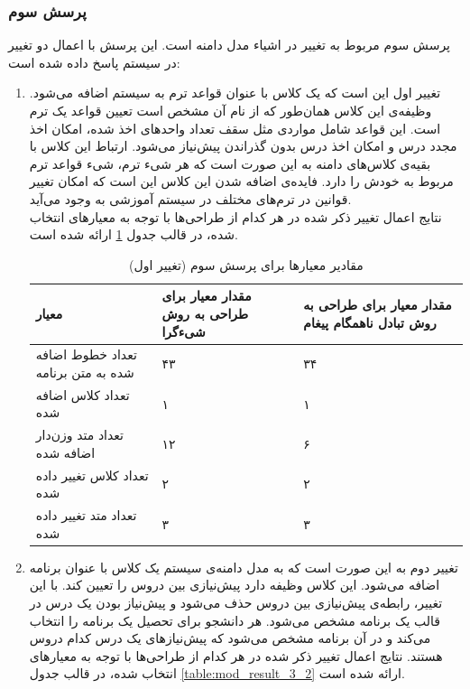 \subsubsection{پرسش سوم}
پرسش سوم مربوط به تغییر در اشیاء مدل دامنه است. این پرسش با اعمال دو تغییر در سیستم پاسخ داده شده است:
\begin{enumerate}
\item تغییر اول این است که یک کلاس با عنوان قواعد ترم به سیستم اضافه می‌شود. وظیفه‌ی این کلاس همان‌طور که از نام آن مشخص است تعیین قواعد یک ترم است. این قواعد شامل مواردی مثل سقف تعداد واحدهای اخذ شده، امکان اخذ مجدد درس و امکان اخذ درس بدون گذراندن پیش‌نیاز می‌شود. ارتباط این کلاس با بقیه‌ی کلاس‌های دامنه به این صورت است که هر شیء ترم، شیء قواعد ترم مربوط به خودش را دارد. فایده‌ی اضافه شدن این کلاس این است که امکان تغییر قوانین در ترم‌های مختلف در سیستم آموزشی به وجود می‌آید. \\
 نتایج اعمال تغییر ذکر شده در هر کدام از طراحی‌ها با توجه به معیارهای انتخاب شده، در قالب جدول \ref{table:mod_result_3_1} ارائه شده است.




\begin{table}[ht]
\small
\begin{center}
\begin{tabular}{|p{7cm}|p{4cm}|p{4cm}|}
	\hline
\textbf{معیار} & \textbf{مقدار معیار برای طراحی به روش شیءگرا} & \textbf{مقدار معیار برای طراحی به روش تبادل ناهمگام پیغام} 
\\ 
	\hline
	تعداد خطوط اضافه شده به متن برنامه
	 &
	 ۴۳
	 &
	 ۳۴
\\
	\hline
	تعداد کلاس اضافه شده
	 &
	 ۱
	 &
	 ۱
\\
	\hline
	تعداد متد وزن‌دار اضافه شده
	 &
	 ۱۲
	 &
	 ۶
\\
	\hline

	تعداد کلاس تغییر داده شده
	 &
	۲
	 &
	 ۲
\\
	\hline

	تعداد متد تغییر داده شده
	 &
	۳
	 &
	 ۳
\\
	\hline

\end{tabular}
\caption{\label{table:mod_result_3_1} مقادیر معیارها برای پرسش سوم (تغییر اول)}
\end{center}
\end{table}



\item تغییر دوم به این صورت است که به مدل دامنه‌ی سیستم یک کلاس با عنوان برنامه اضافه می‌شود. این کلاس وظیفه دارد پیش‌نیازی بین دروس را تعیین کند. با این تغییر، رابطه‌ی پیش‌نیازی بین دروس حذف می‌شود و پیش‌نیاز بودن یک درس در قالب یک برنامه مشخص می‌شود. هر دانشجو برای تحصیل یک برنامه را انتخاب می‌کند و در آن برنامه مشخص می‌شود که پیش‌نیازهای یک درس کدام دروس هستند.
 نتایج اعمال تغییر ذکر شده در هر کدام از طراحی‌ها با توجه به معیارهای انتخاب شده، در قالب جدول \ref{table:mod_result_3_2} ارائه شده است.


\end{enumerate}
